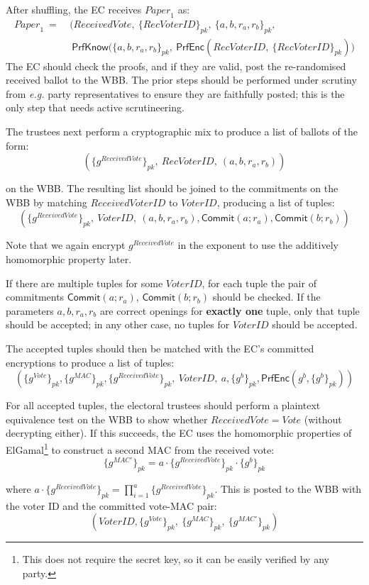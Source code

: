 \documentclass[12pt,a4paper]{article}
\newcommand{\commit}{\mathsf{Commit}}
\newcommand{\PrfEnc}{\mathsf{PrfEnc}}
\newcommand{\PrfKnow}{\mathsf{PrfKnow}}
\theoremstyle{definition}
\newcommand{\Vote}{\mathit{Vote}}
\newcommand{\VoterID}{\mathit{VoterID}}
\newcommand{\receivedvid}{\mathit{RecVoterID}}
\newcommand{\Paper}{\mathit{Paper}}
\newcommand{\Mac}{\mathit{MAC}}
\newcommand{\eg}{\textit{e.g. }}
\begin{document}
After shuffling, the EC receives $\Paper_1$ as:
\begin{align*}
    \Paper_1\ =\ &\big(ReceivedVote,\ \{\receivedvid\}_{pk},\ \{a,b,r_a,r_b\}_{pk},\\
             &\ \PrfKnow(\{a,b,r_a,r_b\}_{pk},\ \mathsf{PrfEnc}(\receivedvid,\ \{\receivedvid\}_{pk})\big)
\end{align*}
The EC should check the proofs, and if they are valid, post the re-randomised received ballot to the WBB. The prior steps should be performed under scrutiny from \eg party representatives to ensure they are faithfully posted; this is the only step that needs active scrutineering.

The trustees next perform a cryptographic mix to produce a list of ballots of the form:
$$\left(\{g^{ReceivedVote}\}_{pk},\ \receivedvid,\ (a,b,r_a,r_b)\right)$$

on the WBB. The resulting list should be joined to the commitments on the WBB by matching $ReceivedVoterID$ to $\VoterID$, producing a list of tuples:
$$\left(\{g^{ReceivedVote}\}_{pk},\ \VoterID,\ (a,b,r_a,r_b), \commit(a;r_a), \commit(b;r_b)\right)$$

Note that we again encrypt $g^{ReceivedVote}$ in the exponent to use the additively homomorphic property later.

If there are multiple tuples for some $\VoterID$, for each tuple the pair of commitments $\commit(a;r_a)$, $\commit(b;r_b)$ should be checked. If the parameters $a,b,r_a,r_b$ are correct openings for \textbf{exactly one} tuple, only that tuple should be accepted; in any other case, no tuples for $\VoterID$ should be accepted.

The accepted tuples should then be matched with the EC's committed encryptions to produce a list of tuples:
$$\left(\{g^{\Vote}\}_{pk},\{g^\Mac\}_{pk}, \{g^{ReceivedVote}\}_{pk},\ \VoterID,\ a, \{g^b\}_{pk}, \PrfEnc(g^b, \{g^b\}_{pk})\right)$$

For all accepted tuples, the electoral trustees should perform a plaintext equivalence test on the WBB to show whether $ReceivedVote=\Vote$ (without decrypting either). If this succeeds, the EC uses the homomorphic properties of ElGamal\footnote{This does not require the secret key, so it can be easily verified by any party.} to construct a second MAC from the received vote:
$$\{g^{\Mac'}\}_{pk}=a\cdot\{g^{ReceivedVote}\}_{pk}\cdot\{g^{b}\}_{pk}$$

where $a\cdot\{g^{ReceivedVote}\}_{pk} = \prod_{i=1}^a \{g^{ReceivedVote}\}_{pk}$. This is posted to the WBB with the voter ID and the committed vote-MAC pair:
$$\left(\VoterID, \{g^{\Vote}\}_{pk},\ \{g^\Mac\}_{pk},\ \{g^{\Mac'}\}_{pk}\right)$$
\end{document}

